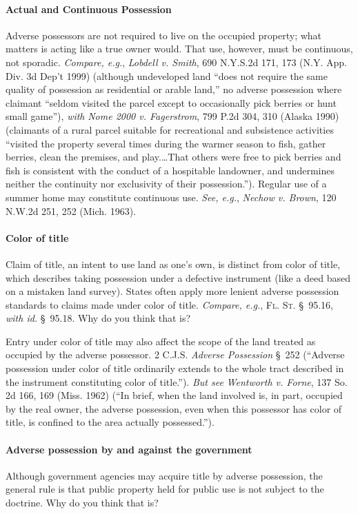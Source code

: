 \paragraph{Actual and Continuous Possession} Adverse possessors are
not required to live on the occupied property; what matters is acting like a
true owner would. That use, however, must be continuous, not sporadic.
\textit{Compare, e.g.}, \emph{Lobdell v. Smith}, 690 N.Y.S.2d 171, 173 (N.Y.
App. Div.
3d Dep't 1999) (although undeveloped land ``does not require the same quality
of possession as residential or arable land,'' no adverse possession where
claimant ``seldom visited the parcel except to occasionally pick berries or
hunt small game''), \textit{with} \emph{Nome 2000 v. Fagerstrom}, 799 P.2d 304,
310
(Alaska 1990) (claimants of a rural parcel suitable for recreational and
subsistence activities ``visited the property several times during the warmer
season to fish, gather berries, clean the premises, and play.\ldots That
others were free to pick berries and fish is consistent with the conduct of a
hospitable landowner, and undermines neither the continuity nor exclusivity of
their possession.''). Regular use of a summer home may constitute continuous
use. \textit{See, e.g.}, \emph{Nechow v. Brown}, 120 N.W.2d 251, 252 (Mich.
1963).

\paragraph{Color of title} Claim of title, an intent to use land as one's
own, is distinct from color of title, which describes taking possession under a
defective instrument (like a deed based on a mistaken land survey). States
often apply more lenient adverse possession standards to claims made under
color of title. \textit{Compare, e.g.}, \textsc{Fl. St.} \S~95.16, \textit{with
id.} \S~95.18. Why do you think that is? 

Entry under color of title may also affect the scope of the land treated as
occupied by the adverse possessor. 2 C.J.S. \textit{Adverse Possession} \S~252
(``Adverse possession under color of title ordinarily extends to the whole
tract described in the instrument constituting color of title.''). \textit{But
see} \emph{Wentworth v. Forne}, 137 So. 2d 166, 169 (Miss. 1962) (``In brief, when the
land involved is, in part, occupied by the real owner, the adverse possession,
even when this possessor has color of title, is confined to the area actually
possessed.'').

\paragraph{Adverse possession by and against the government}
Although government agencies may acquire title by adverse possession, the
general rule is that public property held for public use is not subject to the
doctrine. Why do you think that is?


